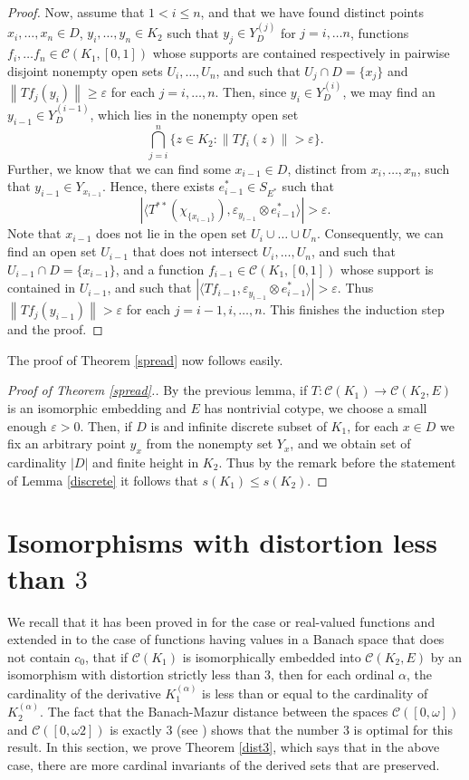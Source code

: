 \documentclass{amsart}
\numberwithin{equation}{section}
\theoremstyle{definition}
\def\C{\mathcal C}
\def\ep{\varepsilon}
\def\la{\langle}
\def\ra{\rangle}
\newcommand{\norm}[1]{\left\|#1\right\|}
\newcommand{\abs}[1]{\left| #1  \right|}
\begin{document}
\begin{proof}
Now, assume that $1 <i \leq n$, and that we have found distinct points $x_i, \ldots, x_n \in D$, $y_i, \ldots, y_n \in K_2$ such that $y_j \in Y_D^{(j)}$ for $j=i, \ldots n$, functions $f_i, \ldots f_n \in \C(K_1, [0, 1])$ whose supports are contained respectively in pairwise disjoint nonempty open sets $U_i, \ldots, U_n$, and such that $U_j \cap D=\{x_j\}$ and $\norm{Tf_j(y_i)} \geq \ep$ for each $j=i, \ldots, n$. Then, since $y_i \in Y_D^{(i)}$, we may find an $y_{i-1} \in Y_D^{(i-1)}$, which lies in the nonempty open set 
\[ \bigcap_{j=i}^n \{z \in K_2:\norm{Tf_i(z)}>\ep\}.\]
Further, we know that we can find some $x_{i-1} \in D$, distinct from $x_i, \ldots, x_n$, such that $y_{i-1} \in Y_{x_{i-1}}$.
Hence, there exists $e_{i-1}^* \in S_{E^*}$ such that 
\[\abs{\la T^{**}(\chi_{\{x_{i-1}\}}), \ep_{y_{i-1}} \otimes e_{i-1}^* \ra}>\ep.\]
Note that $x_{i-1}$ does not lie in the open set $U_i \cup \ldots \cup U_n$.
Consequently, we can find an open set $U_{i-1}$ that does not intersect $U_i, \ldots, U_n$, and such that $U_{i-1} \cap D=\{x_{i-1}\}$, and a function $f_{i-1} \in \C(K_1, [0, 1])$ whose support is contained in $U_{i-1}$, and such that $\abs{\la Tf_{i-1}, \ep_{y_{i-1}} \otimes e_{i-1}^*\ra}>\ep$. Thus $\norm{Tf_{j}(y_{i-1})}>\ep$ for each $j=i-1, i, \ldots, n$. This finishes the induction step and the proof.
\end{proof}

The proof of Theorem \ref{spread} now follows easily.

\begin{proof}[Proof of Theorem \ref{spread}.]
By the previous lemma, if $T:\C(K_1) \rightarrow \C(K_2, E)$ is an isomorphic embedding and $E$ has nontrivial cotype, we choose a small enough $\ep>0$. Then, if $D$ is and infinite discrete subset of $K_1$, for each $x \in D$ we fix an arbitrary point $y_x$ from the nonempty set $Y_x$, and we obtain set of cardinality $\abs{D}$ and finite height in $K_2$. Thus by the remark before the statement of Lemma \ref{discrete} it follows that $s(K_1) \leq s(K_2)$.
\end{proof}

\section{Isomorphisms with distortion less than $3$}

We recall that it has been proved in \cite{Gordon3} for the case or real-valued functions and extended in \cite{GalegoVillamizar} to the case of functions having values in a Banach space that does not contain $c_0$, that if $\C(K_1)$ is isomorphically embedded into $\C(K_2, E)$ by an isomorphism with distortion strictly less than $3$, then for each ordinal $\alpha$, the cardinality of the derivative $K_1^{(\alpha)}$ is less than or equal to the cardinality of $K_2^{(\alpha)}$. The fact that the Banach-Mazur distance between the spaces $\C([0, \omega])$ and $\C([0, \omega 2])$ is exactly $3$ (see \cite{Gordon3}) shows that the number $3$ is optimal for this result. In this section, we prove Theorem \ref{dist3}, which says that in the above case, there are more cardinal invariants of the derived sets that are preserved.
\end{document}
